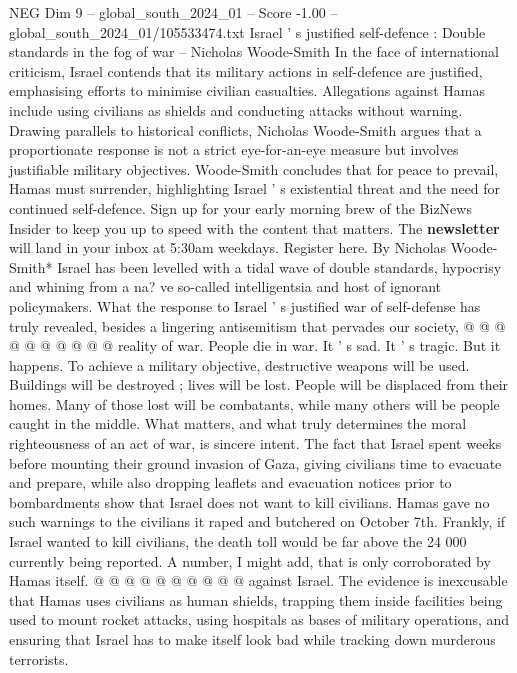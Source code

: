 \begin{textsample}{NEG Dim 9 – global\_south\_2024\_01 – Score -1.00 – global\_south\_2024\_01/105533474.txt}  \label{ex:f9_neg_393}
Israel ' s justified self-defence : Double standards in the fog of war -- Nicholas Woode-Smith In the face of international criticism, Israel contends that its military actions in self-defence are justified, emphasising efforts to minimise civilian casualties.
Allegations against Hamas include using civilians as shields and conducting attacks without warning.
Drawing parallels to historical conflicts, Nicholas Woode-Smith argues that a proportionate response is not a strict eye-for-an-eye measure but involves justifiable military objectives.
Woode-Smith concludes that for peace to prevail, Hamas must surrender, highlighting Israel ' s existential threat and the need for continued self-defence.
Sign up for your early morning brew of the BizNews Insider to keep you up to speed with the content that matters.
The \textbf{newsletter} will land in your inbox at 5:30am weekdays.
Register here.
By Nicholas Woode-Smith* Israel has been levelled with a tidal wave of double standards, hypocrisy and whining from a na? ve so-called intelligentsia and host of ignorant policymakers.
What the response to Israel ' s justified war of self-defense has truly revealed, besides a lingering antisemitism that pervades our society, @ @ @ @ @ @ @ @ @ @ reality of war.
People die in war.
It ' s sad.
It ' s tragic.
But it happens.
To achieve a military objective, destructive weapons will be used.
Buildings will be destroyed ; lives will be lost.
People will be displaced from their homes.
Many of those lost will be combatants, while many others will be people caught in the middle.
What matters, and what truly determines the moral righteousness of an act of war, is sincere intent.
The fact that Israel spent weeks before mounting their ground invasion of Gaza, giving civilians time to evacuate and prepare, while also dropping leaflets and evacuation notices prior to bombardments show that Israel does not want to kill civilians.
Hamas gave no such warnings to the civilians it raped and butchered on October 7th.
Frankly, if Israel wanted to kill civilians, the death toll would be far above the 24 000 currently being reported.
A number, I might add, that is only corroborated by Hamas itself. @ @ @ @ @ @ @ @ @ @ against Israel.
The evidence is inexcusable that Hamas uses civilians as human shields, trapping them inside facilities being used to mount rocket attacks, using hospitals as bases of military operations, and ensuring that Israel has to make itself look bad while tracking down murderous terrorists.

\end{textsample}
